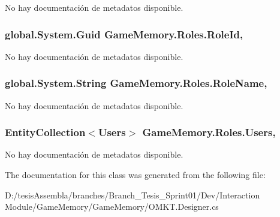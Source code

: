 No hay documentación de metadatos disponible. 

\hypertarget{class_game_memory_1_1_roles_a5bd242a9360210f533b781b88f8048e2}{
\subsubsection[{Role\-Id}]{\setlength{\rightskip}{0pt plus 5cm}global.\-System.\-Guid Game\-Memory.\-Roles.\-Role\-Id\hspace{0.3cm}{\ttfamily [get]}, {\ttfamily [set]}}}\label{class_game_memory_1_1_roles_a5bd242a9360210f533b781b88f8048e2}


No hay documentación de metadatos disponible. 

\hypertarget{class_game_memory_1_1_roles_a0bb55986f20f2f4d2356cefc63638d16}{
\subsubsection[{Role\-Name}]{\setlength{\rightskip}{0pt plus 5cm}global.\-System.\-String Game\-Memory.\-Roles.\-Role\-Name\hspace{0.3cm}{\ttfamily [get]}, {\ttfamily [set]}}}\label{class_game_memory_1_1_roles_a0bb55986f20f2f4d2356cefc63638d16}


No hay documentación de metadatos disponible. 

\hypertarget{class_game_memory_1_1_roles_ad0095e11f320d6670960cfdf46f4c01c}{
\subsubsection[{Users}]{\setlength{\rightskip}{0pt plus 5cm}Entity\-Collection$<${\bf Users}$>$ Game\-Memory.\-Roles.\-Users\hspace{0.3cm}{\ttfamily [get]}, {\ttfamily [set]}}}\label{class_game_memory_1_1_roles_ad0095e11f320d6670960cfdf46f4c01c}


No hay documentación de metadatos disponible. 



The documentation for this class was generated from the following file\-:\begin{DoxyCompactItemize}
\item 
D\-:/tesis\-Assembla/branches/\-Branch\-\_\-\-Tesis\-\_\-\-Sprint01/\-Dev/\-Interaction Module/\-Game\-Memory/\-Game\-Memory/O\-M\-K\-T.\-Designer.\-cs\end{DoxyCompactItemize}
